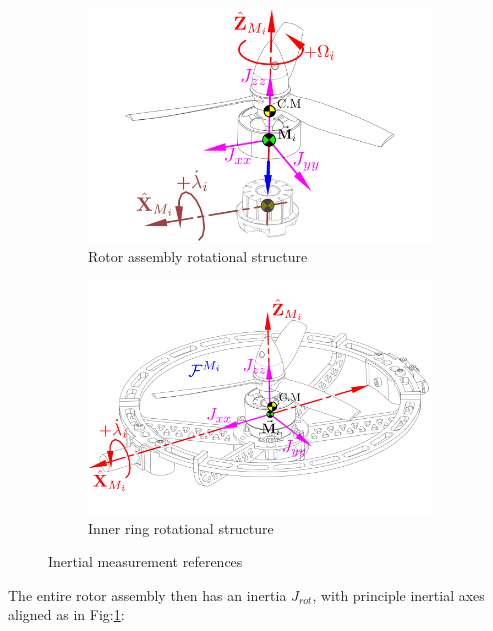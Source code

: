 \begin{figure}[htbp]
\centering
\begin{subfigure}{0.49\textwidth}
\includegraphics[width=\textwidth]{figs/inertia-prop}
\caption{Rotor assembly rotational structure}
\label{fig:inertia-prop}
\end{subfigure}
\begin{subfigure}{0.49\textwidth}
\includegraphics[width=\textwidth]{figs/inertia-inner}
\caption{Inner ring rotational structure}
\label{fig:inertia-inner}
\end{subfigure}
\caption{Inertial measurement references}
\vspace{-5pt}
\end{figure}
\par
The entire rotor assembly then has an inertia $J_{rot}$, with principle inertial axes aligned as in Fig:\ref{fig:inertia-prop}:
